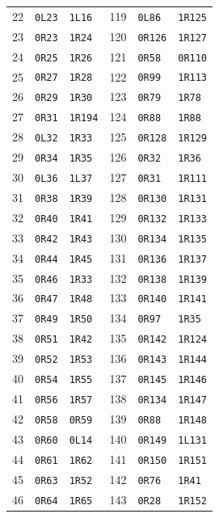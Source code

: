 \begin{longtable}{@{}rll@{\qquad}rll@{}}
22&\texttt{0L23}&\texttt{1L16}&119&\texttt{0L86}&\texttt{1R125}\\
23&\texttt{0R23}&\texttt{1R24}&120&\texttt{0R126}&\texttt{1R127}\\
24&\texttt{0R25}&\texttt{1R26}&121&\texttt{0R58}&\texttt{0R110}\\
25&\texttt{0R27}&\texttt{1R28}&122&\texttt{0R99}&\texttt{1R113}\\
26&\texttt{0R29}&\texttt{1R30}&123&\texttt{0R79}&\texttt{1R78}\\
27&\texttt{0R31}&\texttt{1R194}&124&\texttt{0R88}&\texttt{1R88}\\
28&\texttt{0L32}&\texttt{1R33}&125&\texttt{0R128}&\texttt{1R129}\\
29&\texttt{0R34}&\texttt{1R35}&126&\texttt{0R32}&\texttt{1R36}\\
30&\texttt{0L36}&\texttt{1L37}&127&\texttt{0R31}&\texttt{1R111}\\
31&\texttt{0R38}&\texttt{1R39}&128&\texttt{0R130}&\texttt{1R131}\\
32&\texttt{0R40}&\texttt{1R41}&129&\texttt{0R132}&\texttt{1R133}\\
33&\texttt{0R42}&\texttt{1R43}&130&\texttt{0R134}&\texttt{1R135}\\
34&\texttt{0R44}&\texttt{1R45}&131&\texttt{0R136}&\texttt{1R137}\\
35&\texttt{0R46}&\texttt{1R33}&132&\texttt{0R138}&\texttt{1R139}\\
36&\texttt{0R47}&\texttt{1R48}&133&\texttt{0R140}&\texttt{1R141}\\
37&\texttt{0R49}&\texttt{1R50}&134&\texttt{0R97}&\texttt{1R35}\\
38&\texttt{0R51}&\texttt{1R42}&135&\texttt{0R142}&\texttt{1R124}\\
39&\texttt{0R52}&\texttt{1R53}&136&\texttt{0R143}&\texttt{1R144}\\
40&\texttt{0R54}&\texttt{1R55}&137&\texttt{0R145}&\texttt{1R146}\\
41&\texttt{0R56}&\texttt{1R57}&138&\texttt{0R134}&\texttt{1R147}\\
42&\texttt{0R58}&\texttt{0R59}&139&\texttt{0R88}&\texttt{1R148}\\
43&\texttt{0R60}&\texttt{0L14}&140&\texttt{0R149}&\texttt{1L131}\\
44&\texttt{0R61}&\texttt{1R62}&141&\texttt{0R150}&\texttt{1R151}\\
45&\texttt{0R63}&\texttt{1R52}&142&\texttt{0R76}&\texttt{1R41}\\
46&\texttt{0R64}&\texttt{1R65}&143&\texttt{0R28}&\texttt{1R152}\\

\end{longtable}
